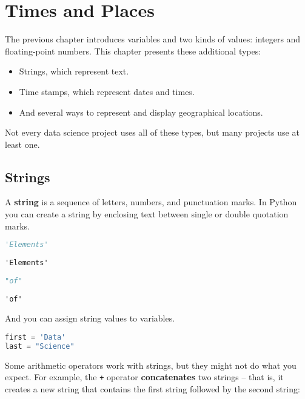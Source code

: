 \chapter{Times and Places}\label{times-and-places}

The previous chapter introduces variables and two kinds of values:
integers and floating-point numbers. This chapter presents these
additional types:

\begin{itemize}
\item
  Strings, which represent text.
\item
  Time stamps, which represent dates and times.
\item
  And several ways to represent and display geographical locations.
\end{itemize}

Not every data science project uses all of these types, but many
projects use at least one.

\section{Strings}\label{strings}

A \textbf{string} is a sequence of letters, numbers, and punctuation
marks. In Python you can create a string by enclosing text between
single or double quotation marks.

\begin{lstlisting}[language=Python,style=source]
'Elements'
\end{lstlisting}

\begin{lstlisting}[style=output]
'Elements'
\end{lstlisting}

\begin{lstlisting}[language=Python,style=source]
"of"
\end{lstlisting}

\begin{lstlisting}[style=output]
'of'
\end{lstlisting}

And you can assign string values to variables.

\begin{lstlisting}[language=Python,style=source]
first = 'Data'
last = "Science"
\end{lstlisting}

Some arithmetic operators work with strings, but they might not do what
you expect. For example, the \passthrough{\lstinline!+!} operator
\textbf{concatenates} two strings -- that is, it creates a new string
that contains the first string followed by the second string:

